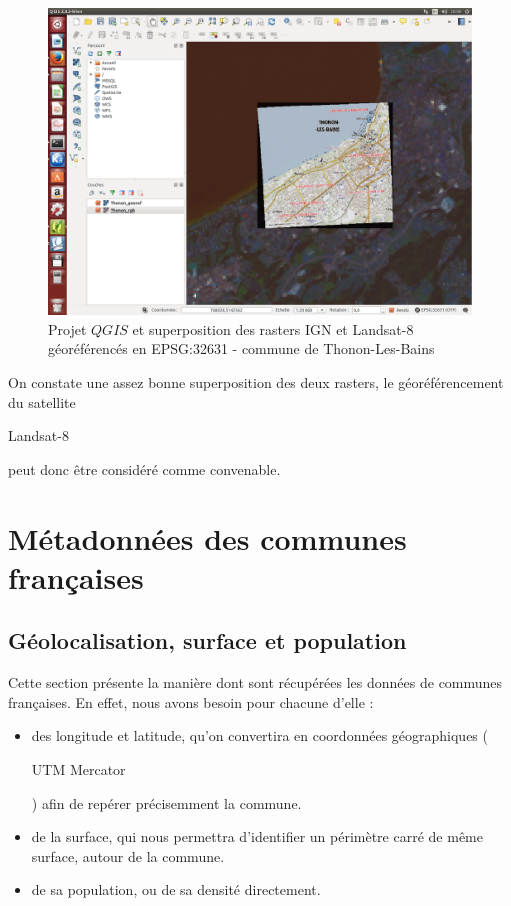 \documentclass{book}
\begin{document}
\begin{figure}[H]
\begin{center}
\includegraphics[scale=0.3]{images/georeferencing/qgis-superposition0.png}
\end{center}
\caption{Projet $QGIS$ et superposition des rasters IGN et Landsat-8 géoréférencés en EPSG:32631 - commune de Thonon-Les-Bains}
\label{qgis_super}
\end{figure}

On constate une assez bonne superposition des deux rasters, le géoréférencement du satellite \begin{itshape}Landsat-8\end{itshape} peut
 donc \^{e}tre considéré comme convenable.

\chapter{Métadonnées des communes françaises}

\section{Géolocalisation, surface et population}

Cette section présente la manière dont sont récupérées les données de communes françaises. En effet, nous avons besoin pour chacune d'elle  :
\begin{itemize}
  \item des longitude et latitude, qu'on convertira en coordonnées géographiques (\begin{itshape}UTM Mercator\end{itshape}) afin de repérer précisemment la commune.
  \item de la surface, qui nous permettra d'identifier un périmètre carré de même surface, autour de la commune.
  \item de sa population, ou de sa densité directement.
\end{itemize}
\end{document}
